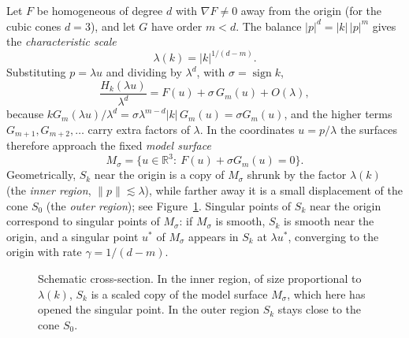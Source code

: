 Let $F$ be homogeneous of degree $d$ with $\nabla F\neq0$ away from the
origin (for the cubic cones $d=3$), and let $G$ have order $m<d$. The balance
$|p|^d=|k|\,|p|^m$ gives the \emph{characteristic scale}
\begin{equation}
\label{eq:scale}
\lambda(k)=|k|^{1/(d-m)} .
\end{equation}
Substituting $p=\lambda u$ and dividing by $\lambda^d$, with $\sigma=\operatorname{sign}k$,
\begin{equation}
\label{eq:rescaled}
\frac{H_k(\lambda u)}{\lambda^d}=F(u)+\sigma\,G_m(u)+O(\lambda),
\end{equation}
because $kG_m(\lambda u)/\lambda^d=\sigma\lambda^{m-d}|k|\,G_m(u)=\sigma G_m(u)$,
and the higher terms $G_{m+1},G_{m+2},\dots$ carry extra factors of $\lambda$.
In the coordinates $u=p/\lambda$ the surfaces therefore approach the fixed
\emph{model surface}
\begin{equation}
\label{eq:model}
M_\sigma=\{u\in\mathbb{R}^3:\ F(u)+\sigma G_m(u)=0\}.
\end{equation}
Geometrically, $S_k$ near the origin is a copy of $M_\sigma$ shrunk by the
factor $\lambda(k)$ (the \emph{inner region}, $\|p\|\lesssim\lambda$), while
farther away it is a small displacement of the cone $S_0$ (the \emph{outer
region}); see Figure~\ref{fig:inner-outer}. Singular points of $S_k$ near the
origin correspond to singular points of $M_\sigma$: if $M_\sigma$ is smooth,
$S_k$ is smooth near the origin, and a singular point $u^\ast$ of $M_\sigma$
appears in $S_k$ at $\lambda u^\ast$, converging to the origin with rate
$\gamma=1/(d-m)$.

\begin{figure}[!h]
\centering
{}
\caption[Inner and outer region]{Schematic cross-section. In the inner region,
of size proportional to $\lambda(k)$, $S_k$ is a scaled copy of the model
surface $M_\sigma$, which here has opened the singular point. In the outer
region $S_k$ stays close to the cone $S_0$.}
\label{fig:inner-outer}
\end{figure}

